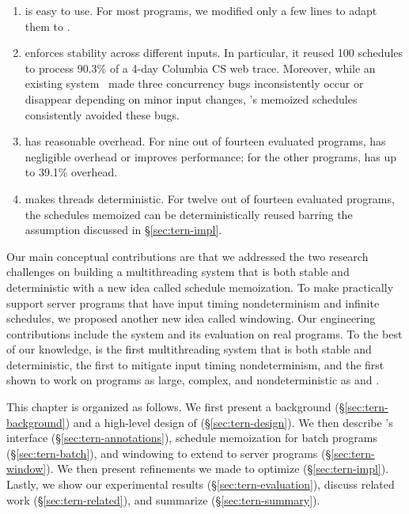 \begin{enumerate}

\item \tern is easy to use.  For most programs, we modified only a few
  lines to adapt them to \tern.

\item \tern enforces stability across different inputs.  In particular, it
  reused 100 schedules to process 90.3\% of a 4-day Columbia CS web trace.
  Moreover, while an existing \dmt system~\cite{coredet:asplos10} made
  three concurrency bugs inconsistently occur or disappear depending on minor
  input changes, \tern's memoized schedules consistently avoided these bugs.

\item \tern has reasonable overhead.  For nine out of fourteen
  evaluated programs, \tern has negligible overhead or improves
  performance; for the other programs, \tern has up to 39.1\%
  overhead.

\item \tern makes threads deterministic.  For twelve out of fourteen
  evaluated programs, the schedules \tern memoized can be deterministically
  reused barring the assumption discussed in \S\ref{sec:tern-impl}.

\end{enumerate}

Our main conceptual contributions are that we addressed the two research
challenges on building a multithreading system that is both stable and 
deterministic with a 
new idea called schedule memoization. To make \tern practically support server 
programs that have input timing nondeterminism and infinite schedules, we 
proposed
another new idea called windowing. Our engineering contributions include the
\tern system and its evaluation on real programs.  To the best of our knowledge,
\tern is the first multithreading system that is both stable and deterministic, 
the first to 
mitigate input timing
nondeterminism, and the first shown to work on programs as large, complex, and
nondeterministic as \apache and \mysql.

This chapter is organized as follows.  We first present a background
(\S\ref{sec:tern-background}) and a high-level design of
\tern (\S\ref{sec:tern-design}). We then describe \tern's interface
(\S\ref{sec:tern-annotations}), schedule memoization for batch programs
(\S\ref{sec:tern-batch}), and windowing to extend \tern to server programs
(\S\ref{sec:tern-window}).  We then present refinements we made to optimize
\tern (\S\ref{sec:tern-impl}).  Lastly, we show our experimental results
(\S\ref{sec:tern-evaluation}), discuss related work (\S\ref{sec:tern-related}),
and summarize \tern (\S\ref{sec:tern-summary}).
